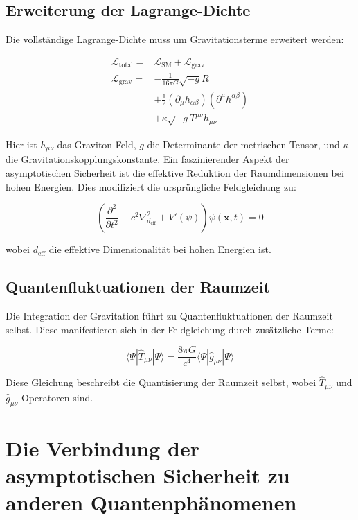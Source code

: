 \documentclass{article}
\begin{document}
\subsection{Erweiterung der Lagrange-Dichte}
Die vollständige Lagrange-Dichte muss um Gravitationsterme erweitert werden:

\begin{equation}
	\begin{aligned}
		\mathcal{L}_\text{total} = & \mathcal{L}_\text{SM} + \mathcal{L}_\text{grav} \\
		\mathcal{L}_\text{grav} = & -\frac{1}{16\pi G} \sqrt{-g}R \\
		& + \frac{1}{2}(\partial_\mu h_{\alpha\beta})(\partial^\mu h^{\alpha\beta}) \\
		& + \kappa \sqrt{-g}T^{\mu\nu}h_{\mu\nu}
	\end{aligned}
\end{equation}

Hier ist $h_{\mu\nu}$ das Graviton-Feld, $g$ die Determinante der metrischen Tensor, und $\kappa$ die Gravitationskopplungskonstante.
Ein faszinierender Aspekt der asymptotischen Sicherheit ist die effektive Reduktion der Raumdimensionen bei hohen Energien. Dies modifiziert die ursprüngliche Feldgleichung zu:

\begin{equation}
	\left( \frac{\partial^2}{\partial t^2} - c^2 \nabla^2_{d_\text{eff}} + V'(\psi) \right) \psi(\mathbf{x},t) = 0
\end{equation}

wobei $d_\text{eff}$ die effektive Dimensionalität bei hohen Energien ist.

\subsection{Quantenfluktuationen der Raumzeit}
Die Integration der Gravitation führt zu Quantenfluktuationen der Raumzeit selbst. Diese manifestieren sich in der Feldgleichung durch zusätzliche Terme:

\begin{equation}
	\langle \Psi | \hat{T}_{\mu\nu} | \Psi \rangle = \frac{8\pi G}{c^4} \langle \Psi | \hat{g}_{\mu\nu} | \Psi \rangle
\end{equation}

Diese Gleichung beschreibt die Quantisierung der Raumzeit selbst, wobei $\hat{T}_{\mu\nu}$ und $\hat{g}_{\mu\nu}$ Operatoren sind.

\section{Die Verbindung der asymptotischen Sicherheit zu anderen Quantenphänomenen}
\end{document}
